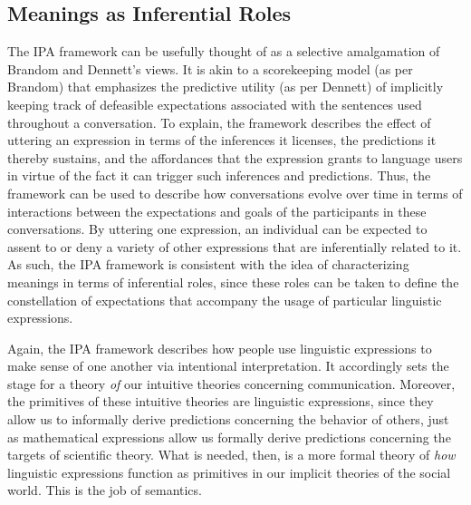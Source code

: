 \subsection{Meanings as Inferential Roles}

The IPA framework can be usefully thought of as a selective amalgamation of Brandom and Dennett's views. It is akin to a scorekeeping model (as per Brandom) that emphasizes the predictive utility (as per Dennett) of implicitly keeping track of defeasible expectations associated with the sentences used throughout a conversation. To explain, the framework describes the effect of uttering an expression in terms of the inferences it licenses, the predictions it thereby sustains, and the affordances that the expression grants to language users in virtue of the fact it can trigger such inferences and predictions. Thus, the framework can be used to describe how conversations evolve over time in terms of interactions between the expectations and goals of the participants in these conversations. By uttering one expression, an individual can be expected to assent to or deny a variety of other expressions that are inferentially related to it. As such, the IPA framework is consistent with the idea of characterizing meanings in terms of inferential roles, since these roles can be taken to define the constellation of expectations that accompany the usage of particular linguistic expressions. 

Again, the IPA framework describes how people use linguistic expressions to make sense of one another via intentional interpretation. It accordingly sets the stage for a theory \textit{of} our intuitive theories concerning communication. Moreover, the primitives of these intuitive theories are linguistic expressions, since they allow us to informally derive predictions concerning the behavior of others, just as mathematical expressions allow us formally derive predictions concerning the targets of scientific theory. What is needed, then, is a more formal theory of \textit{how} linguistic expressions function as primitives in our implicit theories of the social world. This is the job of semantics.

